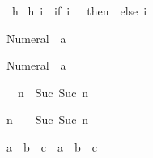 \begin{isabellebody}
\isamarkupfalse%
\ h\ {}{}{}{}\isanewline
{}h\ i\ {}\ {}if\ i\ {}\ {}\ then\ {}\ else\ i{}{}%
\begin{isamarkuptext}%
%
\end{isamarkuptext}%
\isamarkuptrue%
%
\begin{isamarkuptext}%
\begin{isabelle}%
Numeral{}\ {}\ {}{}{}{}a{}%
\end{isabelle}

\begin{isabelle}%
Numeral{}\ {}\ {}{}{}{}a{}%
\end{isabelle}

\begin{isabelle}%
{}\ {}\ n\ {}\ Suc\ {}Suc\ n{}%
\end{isabelle}

\begin{isabelle}%
n\ {}\ {}\ {}\ Suc\ {}Suc\ n{}%
\end{isabelle}

\begin{isabelle}%
a\ {}\ b\ {}\ c\ {}\ a\ {}\ {}b\ {}\ c{}%
\end{isabelle}


\end{isamarkuptext}
\end{isabellebody}
